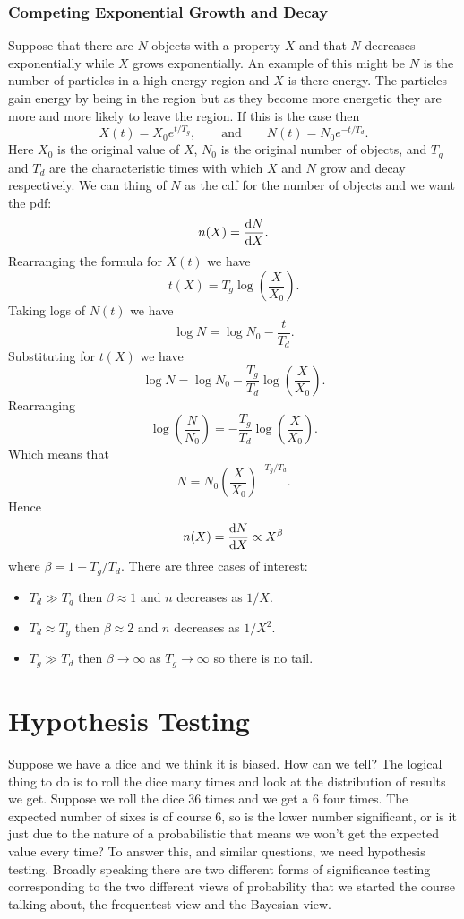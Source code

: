 \documentclass[a4paper]{article}
\begin{document}
    \subsubsection{Competing Exponential Growth and Decay}
    Suppose that there are \(N\) objects with a property \(X\) and that \(N\) decreases exponentially while \(X\) grows exponentially.
    An example of this might be \(N\) is the number of particles in a high energy region and \(X\) is there energy.
    The particles gain energy by being in the region but as they become more energetic they are more and more likely to leave the region.
    If this is the case then
    \[X(t) = X_0e^{t/T_g},\qquad\text{and}\qquad N(t) = N_0e^{-t/T_d}.\]
    Here \(X_0\) is the original value of \(X\), \(N_0\) is the original number of objects, and \(T_g\) and \(T_d\) are the characteristic times with which \(X\) and \(N\) grow and decay respectively.
    We can thing of \(N\) as the \gls{cdf} for the number of objects and we want the \gls{pdf}:
    \[n(X) = \dv{N}{X}.\]
    Rearranging the formula for \(X(t)\) we have
    \[t(X) = T_g\log\left(\frac{X}{X_0}\right).\]
    Taking logs of \(N(t)\) we have
    \[\log N = \log N_0 - \frac{t}{T_d}.\]
    Substituting for \(t(X)\) we have
    \[\log N = \log N_0 - \frac{T_g}{T_d}\log\left(\frac{X}{X_0}\right).\]
    Rearranging
    \[\log\left(\frac{N}{N_0}\right) = -\frac{T_g}{T_d}\log\left(\frac{X}{X_0}\right).\]
    Which means that
    \[N = N_0\left(\frac{X}{X_0}\right)^{-T_g/T_d}.\]
    Hence
    \[n(X) = \dv{N}{X} \propto X^{\beta}\]
    where \(\beta = 1 + T_g/T_d\).
    There are three cases of interest:
    \begin{itemize}
        \item \(T_d \gg T_g\) then \(\beta \approx 1\) and \(n\) decreases as \(1/X\).
        \item \(T_d \approx T_g\) then \(\beta \approx 2\) and \(n\) decreases as \(1/X^2\).
        \item \(T_g \gg T_d\) then \(\beta \to \infty\) as \(T_g\to\infty\) so there is no tail.
    \end{itemize}

    \section{Hypothesis Testing}
    Suppose we have a dice and we think it is biased.
    How can we tell?
    The logical thing to do is to roll the dice many times and look at the distribution of results we get.
    Suppose we roll the dice 36 times and we get a 6 four times.
    The expected number of sixes is of course 6, so is the lower number significant, or is it just due to the nature of a probabilistic that means we won't get the expected value every time?
    To answer this, and similar questions, we need hypothesis testing.
    Broadly speaking there are two different forms of significance testing corresponding to the two different views of probability that we started the course talking about, the frequentest view and the Bayesian view.
    
\end{document}
